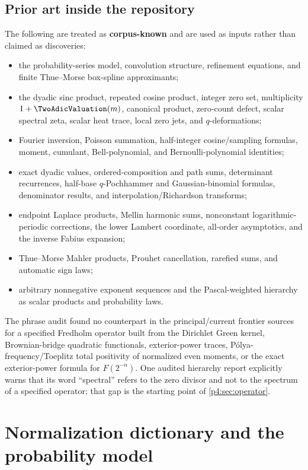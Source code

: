 \documentclass[11pt]{article}
\theoremstyle{definition}
\theoremstyle{remark}
\newcommand{\CorpusKnown}{\textcolor{linkblue}{\textbf{corpus-known}}}
\begin{document}
\subsection{Prior art inside the repository}

The following are treated as \CorpusKnown{} and are used as inputs rather than claimed
as discoveries:
\begin{itemize}[leftmargin=2em]
\item the probability-series model, convolution structure, refinement equations, and
      finite Thue--Morse box-spline approximants;
\item the dyadic sinc product, repeated cosine product, integer zero set, multiplicity
      \(1+\TwoAdicValuation(m)\), canonical product, zero-count defect, scalar spectral zeta,
      scalar heat trace, local zero jets, and \(q\)-deformations;
\item Fourier inversion, Poisson summation, half-integer cosine/sampling formulas,
      moment, cumulant, Bell-polynomial, and Bernoulli-polynomial identities;
\item exact dyadic values, ordered-composition and path sums, determinant recurrences,
      half-base \(q\)-Pochhammer and Gaussian-binomial formulas, denominator results,
      and interpolation/Richardson transforms;
\item endpoint Laplace products, Mellin harmonic sums, nonconstant logarithmic-periodic
      corrections, the lower Lambert coordinate, all-order asymptotics, and the inverse
      Fabius expansion;
\item Thue--Morse Mahler products, Prouhet cancellation, rarefied sums, and automatic
      sign laws;
\item arbitrary nonnegative exponent sequences and the Pascal-weighted hierarchy as
      scalar products and probability laws.
\end{itemize}

The phrase audit found no counterpart in the principal/current frontier sources for a
specified Fredholm operator built from the Dirichlet Green kernel, Brownian-bridge
quadratic functionals, exterior-power traces, P\'olya-frequency/Toeplitz total
positivity of normalized even moments, or the exact exterior-power formula for
\(F(2^{-n})\).  One audited hierarchy report explicitly warns that its word
``spectral'' refers to the zero divisor and not to the spectrum of a specified operator;
that gap is the starting point of \cref{p4:sec:operator}.

\section{Normalization dictionary and the probability model}
\label{p4:sec:normalization}
\end{document}
